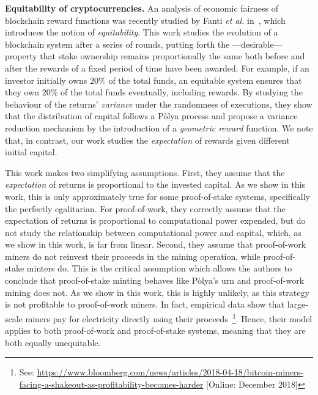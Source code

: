 
\noindent\textbf{Equitability of cryptocurrencies.}
An analysis of economic fairness of
blockchain reward functions was recently studied by Fanti \textit{et al.} in~\cite{fanti2018compounding}, which
introduces the notion of \emph{equitability}. This work studies the evolution
of a blockchain system after a series of rounds, putting forth the
---desirable--- property that stake ownership remains proportionally the same
both before and after the rewards of a fixed period of time have been awarded.
For example, if an
investor initially owns $20\%$ of the total funds, an equitable system ensures that they
own $20\%$ of the total funds eventually, \ie including
rewards. By studying the behaviour of the returns' \emph{variance} under the
randomness of executions, they show that the distribution of capital
follows a Pòlya process and propose a variance reduction mechanism
by the introduction of a \emph{geometric reward} function.
We note that, in contrast, our work studies the \emph{expectation} of rewards given different
initial capital.

This work makes two simplifying assumptions.
First, they assume that the \emph{expectation} of returns is proportional to the
invested capital. As we show in this work, this is only
approximately true for some proof-of-stake systems, specifically the perfectly egalitarian. For proof-of-work, they
correctly assume that the expectation of returns is proportional to computational
power expended, but do not study the relationship between computational power and
capital, which, as we show in this work, is far from linear. Second, they assume that
proof-of-work miners do not reinvest their proceeds in the
mining operation, while proof-of-stake minters do. This is the critical assumption which allows the authors to
conclude that proof-of-stake minting behaves like Pòlya's urn and
proof-of-work mining does not. As we show in this work, this
is highly unlikely, as this strategy is not profitable to proof-of-work
miners. In fact, empirical data show that large-scale miners pay for electricity
directly using their proceeds~\footnote{See:
\url{https://www.bloomberg.com/news/articles/2018-04-18/bitcoin-miners-facing-a-shakeout-as-profitability-becomes-harder}
[Online: December 2018]}. Hence, their model applies to both proof-of-work and
proof-of-stake systems, meaning that they are both equally unequitable.

